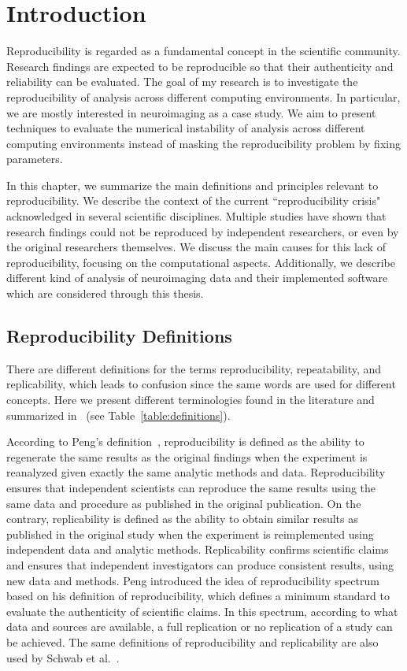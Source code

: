 \chapter{Introduction}
\label{ch:intro}

Reproducibility is regarded as a fundamental concept in the scientific 
community. Research findings are expected to be reproducible so that 
their authenticity and reliability can be evaluated. The goal of my 
research is to investigate the reproducibility of analysis across different 
computing environments. In particular, we are mostly interested in 
neuroimaging as a case study. We aim to present techniques to evaluate 
the numerical instability of analysis across different computing environments 
instead of masking the reproducibility problem by fixing parameters. 

In this chapter, we summarize the main definitions and 
principles relevant to reproducibility. We describe the context of the 
current ``reproducibility crisis" acknowledged in several scientific 
disciplines. Multiple studies have shown that research findings could 
not be reproduced by independent researchers, or even by the original 
researchers themselves. We discuss the main causes for this lack of 
reproducibility, focusing on the computational aspects. 
Additionally, we describe different kind of analysis of 
neuroimaging data and their implemented software which are considered 
through this thesis. 


\section{Reproducibility Definitions}

There are different definitions for the terms reproducibility, 
repeatability, and replicability, which leads to confusion since the 
same words are used for different concepts. Here we present different 
terminologies found in the literature and summarized 
in~\cite{plesser2018reproducibility} (see 
Table~\ref{table:definitions}).
 
According to Peng's definition~\cite{peng2011reproducible}, 
reproducibility is defined as the ability to regenerate the same 
results as the original findings when the experiment is reanalyzed 
given exactly the same analytic methods and data. Reproducibility 
ensures that independent scientists can reproduce the same results 
using the same data and procedure as published in the original 
publication. On the contrary, replicability is defined as the ability 
to obtain similar results as published in the original study when 
the experiment is reimplemented using independent data and analytic 
methods. Replicability confirms scientific claims and ensures that 
independent investigators can produce consistent results, using new 
data and methods. Peng introduced the idea of reproducibility 
spectrum based on his definition of reproducibility, which defines a 
minimum standard to evaluate the authenticity of scientific claims. 
In this spectrum, according to what data and sources are available, a 
full replication or no replication of a study can be achieved. 
The same definitions of reproducibility and replicability 
are also used by Schwab et al.~\cite{schwab2000making}.

